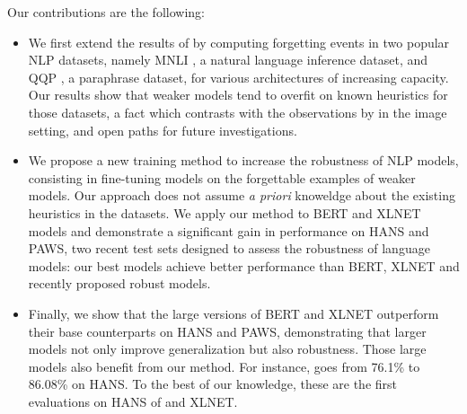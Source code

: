 \noindent
Our contributions are the following:
\begin{itemize}
    \item We first extend the results of  by computing forgetting events in two popular NLP datasets,
    namely MNLI \cite{williams2017broad}, a natural language inference dataset, and QQP \cite{qqp}, a paraphrase dataset, for various architectures of increasing capacity. Our results show that weaker models tend to overfit on known heuristics for those datasets, a fact which contrasts with the observations by  in the image setting, and open paths for future investigations.
    \item We propose a new training method to increase the robustness of NLP models, consisting in fine-tuning models on the forgettable examples of weaker models. Our approach does not assume \emph{a priori} knoweldge
    about the existing heuristics in the datasets. We apply our method to BERT and XLNET models and demonstrate a significant gain in performance on HANS and PAWS, two recent test sets designed to assess the robustness of language models: our best models achieve better performance than BERT, XLNET and recently proposed robust models.
    \item Finally, we show that the large versions of BERT and XLNET outperform their base counterparts on HANS and PAWS, demonstrating that larger models not only improve generalization but also robustness. Those large models also benefit from our method. For instance, \xlnetlarge goes from 76.1\% to 86.08\% on HANS. To the best of our knowledge, these are the first evaluations on HANS of \bertlarge and XLNET.
\end{itemize}


